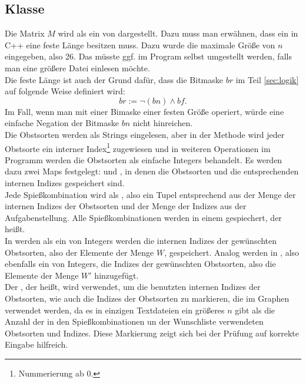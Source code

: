 \subsection{Klasse }
Die Matrix $M$ wird als ein  von  dargestellt.
Dazu muss man erwähnen, dass ein  in C++ eine feste Länge besitzen muss.
Dazu wurde die maximale Größe von $n$ eingegeben, also 26.
Das müsste ggf. im Program selbst umgestellt werden,
falls man eine größere Datei einlesen möchte.\\
Die feste Länge ist auch der Grund dafür, dass die Bitmaske $br$ im Teil \ref{sec:logik}
auf folgende Weise definiert wird:
\[
br := \neg(bn) \land bf.
\]
Im Fall, wenn man mit einer Bimaske einer festen Größe operiert, würde 
eine einfache Negation der Bitmaske $bn$ nicht hinreichen.\\

Die Obstsorten werden als Strings eingelesen, aber in der Methode 
wird jeder Obstsorte ein interner Index\footnote{Nummerierung ab 0.} zugewiesen
und in weiteren Operationen im Programm
werden die Obstsorten als einfache Integers behandelt. 
Es werden dazu zwei Maps festgelegt:  und , 
in denen die Obstsorten und die entsprechenden internen Indizes gespeichert sind.\\

Jede Spießkombination wird als , also ein Tupel entsprechend
aus der Menge der internen Indizes der Obstsorten und der Menge der Indizes aus der Aufgabenstellung.
Alle Spießkombinationen werden in einem  gespiechert, der  heißt.\\

In  werden als ein  von Integers werden die internen Indizes der gewünschten 
Obstsorten, also der Elemente der Menge $W$, gespeichert.
Analog werden in , also ebenfalls ein  von Integers, die Indizes der gewünschten 
Obstsorten, also die Elemente der Menge $W'$ hinzugefügt.\\ 

Der , der  heißt, wird verwendet, um die benutzten internen Indizes der Obstsorten,
wie auch die Indizes der Obstsorten zu markieren, die im Graphen verwendet werden,
da es in einzigen Textdateien ein größeres $n$ gibt als die Anzahl der in den Spießkombinationen 
un der Wunschliste verwendeten Obstsorten und Indizes. 
Diese Markierung zeigt sich bei der Prüfung auf korrekte Eingabe hilfreich.\\

